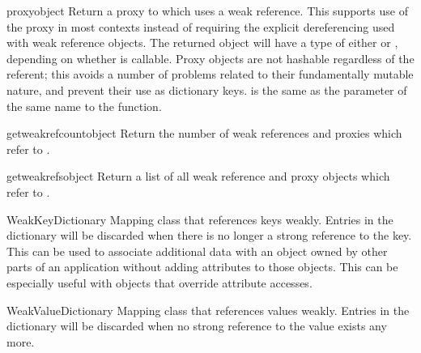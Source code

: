 \begin{funcdesc}{proxy}{object}
  Return a proxy to  which uses a weak reference.  This
  supports use of the proxy in most contexts instead of requiring the
  explicit dereferencing used with weak reference objects.  The
  returned object will have a type of either  or
  , depending on whether  is
  callable.  Proxy objects are not hashable regardless of the
  referent; this avoids a number of problems related to their
  fundamentally mutable nature, and prevent their use as dictionary
  keys.   is the same as the parameter of the same name
  to the  function.
\end{funcdesc}

\begin{funcdesc}{getweakrefcount}{object}
  Return the number of weak references and proxies which refer to
  .
\end{funcdesc}

\begin{funcdesc}{getweakrefs}{object}
  Return a list of all weak reference and proxy objects which refer to
  .
\end{funcdesc}

\begin{classdesc}{WeakKeyDictionary}{}
  Mapping class that references keys weakly.  Entries in the
  dictionary will be discarded when there is no longer a strong
  reference to the key.  This can be used to associate additional data
  with an object owned by other parts of an application without adding
  attributes to those objects.  This can be especially useful with
  objects that override attribute accesses.

\end{classdesc}

\begin{classdesc}{WeakValueDictionary}{}
  Mapping class that references values weakly.  Entries in the
  dictionary will be discarded when no strong reference to the value
  exists any more.

\end{classdesc}

